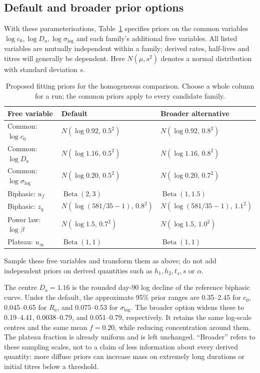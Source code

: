 \documentclass[11pt,a4paper]{article}
\begin{document}
\subsection*{Default and broader prior options}

With these parameterisations, Table~\ref{tab:priors} specifies priors on
the common variables $\log c_0,\log D_a,\log\sigma_{\log}$ and each
family's additional free variables. All listed variables are mutually
independent within a family; derived rates, half-lives and titres will
generally be dependent. Here $N(\mu,s^2)$ denotes a normal distribution
with standard deviation $s$.

\begin{table}[H]
\centering
\small
\caption{Proposed fitting priors for the homogeneous comparison. Choose a
whole column for a run; the common priors apply to every candidate family.}
\label{tab:priors}
\begin{tabularx}{\textwidth}{@{}
  >{\raggedright\arraybackslash}p{}
  >{\centering\arraybackslash}X
  >{\centering\arraybackslash}X@{}}
\toprule
Free variable & Default & Broader alternative \\
\midrule
Common: $\log c_0$ & $N(\log 0.92,\,0.5^2)$
  & $N(\log 0.92,\,0.8^2)$ \\
Common: $\log D_a$ & $N(\log 1.16,\,0.5^2)$
  & $N(\log 1.16,\,0.8^2)$ \\
Common: $\log\sigma_{\log}$ & $N(\log 0.20,\,0.5^2)$
  & $N(\log 0.20,\,0.7^2)$ \\
Biphasic: $u_f$ & $\operatorname{Beta}(2,3)$
  & $\operatorname{Beta}(1,1.5)$ \\
Biphasic: $z_q$ & $N(\log(581/35-1),\,0.8^2)$
  & $N(\log(581/35-1),\,1.1^2)$ \\
Power law: $\log\beta$ & $N(\log 1.5,\,0.7^2)$
  & $N(\log 1.5,\,1.0^2)$ \\
Plateau: $u_\infty$ & $\operatorname{Beta}(1,1)$
  & $\operatorname{Beta}(1,1)$ \\
\bottomrule
\end{tabularx}
\end{table}

Sample these free variables and transform them as above; do not add
independent priors on derived quantities such as $h_1,h_2,t_s,s$ or
$\alpha$.

The centre $D_a=1.16$ is the rounded day-90 log decline of the reference
biphasic curve. Under the default, the approximate 95\% prior ranges are
0.35--2.45 for $c_0$, 0.045--0.65 for $R_a$, and 0.075--0.53 for
$\sigma_{\log}$. The broader option widens these to 0.19--4.41,
0.0038--0.79, and 0.051--0.79, respectively. It retains the same log-scale
centres and the same mean $f=0.20$, while reducing concentration around
them. The plateau fraction is already uniform and is left unchanged.
``Broader'' refers to these sampling scales, not to a claim of less
information about every derived quantity: more diffuse priors can increase
mass on extremely long durations or initial titres below a threshold.
\end{document}
